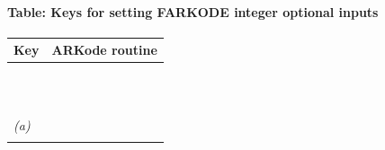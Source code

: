 \documentclass[letterpaper,10pt,english]{sphinxmanual}
\begin{document}
\paragraph{Table: Keys for setting FARKODE integer optional inputs}
\label{f_interface/Usage:table-keys-for-setting-farkode-integer-optional-inputs}\label{f_interface/Usage:finterface-iinoptiontable}
\begin{tabulary}{\linewidth}{|L|L|}
\hline
\textsf{\relax 
Key
} & \textsf{\relax 
ARKode routine
}\\
\hline
{}
 & 
{\hyperref[c_interface/User_callable:c.ARKodeSetOrder]{\emph{}}}
\\
\hline
{}
 & 
{\hyperref[c_interface/User_callable:c.ARKodeSetDenseOrder]{\emph{}}}
\\
\hline
{}
 & 
{\hyperref[c_interface/User_callable:c.ARKodeSetLinear]{\emph{}}}
\\
\hline
{}
 & 
{\hyperref[c_interface/User_callable:c.ARKodeSetNonlinear]{\emph{}}}
\\
\hline
{}
 & 
{\hyperref[c_interface/User_callable:c.ARKodeSetFixedPoint]{\emph{}}}
\\
\hline
{}
 & 
{\hyperref[c_interface/User_callable:c.ARKodeSetNewton]{\emph{}}}
\\
\hline
{}
 & 
{\hyperref[c_interface/User_callable:c.ARKodeSetExplicit]{\emph{}}}
\\
\hline
{}
 & 
{\hyperref[c_interface/User_callable:c.ARKodeSetImplicit]{\emph{}}}
\\
\hline
{}
 & 
{\hyperref[c_interface/User_callable:c.ARKodeSetImEx]{\emph{}}}
\\
\hline
{}
 & 
{\hyperref[c_interface/User_callable:c.ARKodeSetIRKTableNum]{\emph{}}}
\\
\hline
{}
 & 
{\hyperref[c_interface/User_callable:c.ARKodeSetERKTableNum]{\emph{}}}
\\
\hline
{} \emph{(a)}
 & 
{\hyperref[c_interface/User_callable:c.ARKodeSetARKTableNum]{\emph{}}}
\\
\hline
{}
 & 
{\hyperref[c_interface/User_callable:c.ARKodeSetMaxNumSteps]{\emph{}}}

\end{tabulary}
\end{document}

